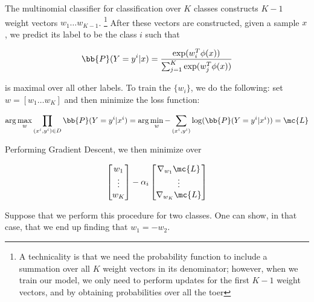 \documentclass[../main.tex]{subfiles}
\begin{document}
\begin{definition}
    The multinomial classifier for classification over $K$ classes constructs $K-1$
    weight vectors $w_{1} \dots w_{K-1}$. \footnote{A technicality is that we need the probability function to include a summation over all $K$ weight vectors in its denominator; however, when we train our model, we only need to perform updates for the first $K-1$ weight vectors, and by obtaining probabilities over all the toer} After these vectors are constructed, given
    a sample $x$, we predict its label to be the class $i$ such that

    \[
        \bb{P}(Y = y^{i} | x) = \frac{\exp(w_{i}^T\phi(x))}{\sum_{j=1}^{K}\exp(w_{j}^T\phi(x))}
    \]

    is maximal over all other labels. To train the $\{w_{i}\}$, we do the following:
    set $w = [w_{1} \dots w_{K}]$ and then minimize the loss function:

    \[
        \arg \max_{w} \prod_{(x^{i},y^{i}) \in D} \bb{P}(Y = y^{i} | x^{i}) = \arg \min_{w} 
        -\sum_{(x^{i}, y^{i})} \log(\bb{P}(Y = y^{i} | x^{i})) = \mc{L}
    \]

    Performing Gradient Descent, we then minimize over

    \[
        \begin{bmatrix}
            w_1 \\
            \vdots \\
            w_{K} \\
        \end{bmatrix} - \alpha_{i} \begin{bmatrix}
            \nabla_{w_1} \mc{L} \\
            \vdots \\
            \nabla_{w_{K}} \mc{L} \\
        \end{bmatrix}
    \]
\end{definition}

\begin{example}
    Suppose that we perform this procedure for two classes. One can show, in that case,
    that we end up finding that $w_1 = -w_2$.
\end{example}
\end{document}
